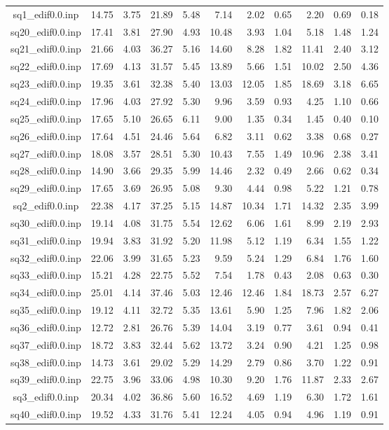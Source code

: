 {\begin{longtable}{@{}cr@{\hspace{1em}}r@{\hspace{1em}}r@{\hspace{1em}}r@{\hspace{1em}}r@{\hspace{2em}}r@{\hspace{1em}}r@{\hspace{1em}}r@{\hspace{1em}}r@{\hspace{1em}}r@{}}
sq1\_edif0.0.inp&14.75&3.75&21.89&5.48&7.14&2.02&0.65&2.20&0.69&0.18\\
sq20\_edif0.0.inp&17.41&3.81&27.90&4.93&10.48&3.93&1.04&5.18&1.48&1.24\\
sq21\_edif0.0.inp&21.66&4.03&36.27&5.16&14.60&8.28&1.82&11.41&2.40&3.12\\
sq22\_edif0.0.inp&17.69&4.13&31.57&5.45&13.89&5.66&1.51&10.02&2.50&4.36\\
sq23\_edif0.0.inp&19.35&3.61&32.38&5.40&13.03&12.05&1.85&18.69&3.18&6.65\\
sq24\_edif0.0.inp&17.96&4.03&27.92&5.30&9.96&3.59&0.93&4.25&1.10&0.66\\
sq25\_edif0.0.inp&17.65&5.10&26.65&6.11&9.00&1.35&0.34&1.45&0.40&0.10\\
sq26\_edif0.0.inp&17.64&4.51&24.46&5.64&6.82&3.11&0.62&3.38&0.68&0.27\\
sq27\_edif0.0.inp&18.08&3.57&28.51&5.30&10.43&7.55&1.49&10.96&2.38&3.41\\
sq28\_edif0.0.inp&14.90&3.66&29.35&5.99&14.46&2.32&0.49&2.66&0.62&0.34\\
sq29\_edif0.0.inp&17.65&3.69&26.95&5.08&9.30&4.44&0.98&5.22&1.21&0.78\\
sq2\_edif0.0.inp&22.38&4.17&37.25&5.15&14.87&10.34&1.71&14.32&2.35&3.99\\
sq30\_edif0.0.inp&19.14&4.08&31.75&5.54&12.62&6.06&1.61&8.99&2.19&2.93\\
sq31\_edif0.0.inp&19.94&3.83&31.92&5.20&11.98&5.12&1.19&6.34&1.55&1.22\\
sq32\_edif0.0.inp&22.06&3.99&31.65&5.23&9.59&5.24&1.29&6.84&1.76&1.60\\
sq33\_edif0.0.inp&15.21&4.28&22.75&5.52&7.54&1.78&0.43&2.08&0.63&0.30\\
sq34\_edif0.0.inp&25.01&4.14&37.46&5.03&12.46&12.46&1.84&18.73&2.57&6.27\\
sq35\_edif0.0.inp&19.12&4.11&32.72&5.35&13.61&5.90&1.25&7.96&1.82&2.06\\
sq36\_edif0.0.inp&12.72&2.81&26.76&5.39&14.04&3.19&0.77&3.61&0.94&0.41\\
sq37\_edif0.0.inp&18.72&3.83&32.44&5.62&13.72&3.24&0.90&4.21&1.25&0.98\\
sq38\_edif0.0.inp&14.73&3.61&29.02&5.29&14.29&2.79&0.86&3.70&1.22&0.91\\
sq39\_edif0.0.inp&22.75&3.96&33.06&4.98&10.30&9.20&1.76&11.87&2.33&2.67\\
sq3\_edif0.0.inp&20.34&4.02&36.86&5.60&16.52&4.69&1.19&6.30&1.72&1.61\\
sq40\_edif0.0.inp&19.52&4.33&31.76&5.41&12.24&4.05&0.94&4.96&1.19&0.91\\

\end{longtable}}
